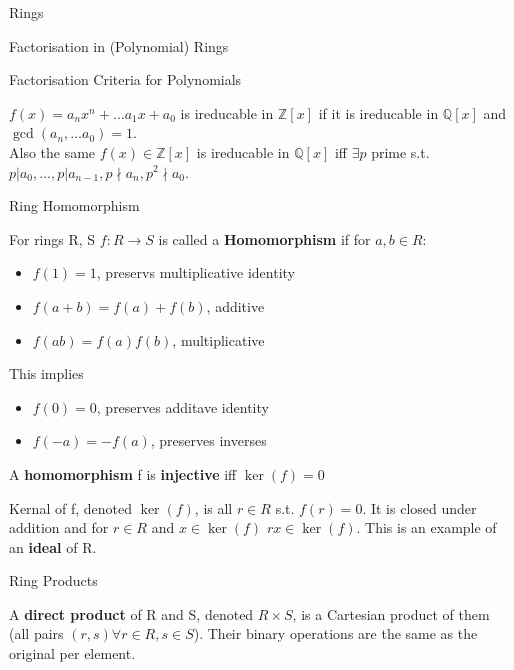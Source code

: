 \documentclass[12pt, letterpaper]{article}
\begin{document}
\begin{section}{Rings}
\begin{subsection}{Factorisation in (Polynomial) Rings}
    \begin{subsubsection}{Factorisation Criteria for Polynomials}

      \(f(x) = a_{n}x^{n} + \dots a_{1}x + a_{0}\) is ireducable in
      \(\mathbb{Z}[x]\) if it is ireducable in \(\mathbb{Q}[x]\) and
      \(\gcd(a_{n}, \dots a_{0}) = 1\). \\
      Also the same \(f(x) \in \mathbb{Z}[x]\) is ireducable in \(\mathbb{Q}[x]\)
      iff \(\exists p\) prime s.t.\ \(p | a_{0}, \dots , p | a_{n - 1}, p \nmid
      a_{n}, p^{2} \nmid a_{0}\).

    \end{subsubsection}

  \end{subsection}

  \begin{subsection}{Ring Homomorphism}

    For rings R, S \(f: R \to S\) is called a \textbf{Homomorphism} if for
    \(a, b \in R\):
    \begin{itemize}
      \item \(f(1) = 1\), preservs multiplicative identity
      \item \(f(a + b) = f(a) + f(b)\), additive
      \item \(f(ab) = f(a)f(b)\), multiplicative
    \end{itemize}

    This implies
    \begin{itemize}
      \item \(f(0) = 0\), preserves additave identity
      \item \(f(-a) = -f(a)\), preserves inverses
    \end{itemize}

    A \textbf{homomorphism} f is \textbf{injective} iff \(\ker(f) = 0\)

    Kernal of f, denoted \(\ker(f)\), is all \(r \in R\) s.t. \(f(r) = 0\). It is
    closed under addition and for \(r \in R\) and \(x \in \ker(f)\) \(rx \in \ker(f)\).
    This is an example of an \textbf{ideal} of R.

  \end{subsection}

  \begin{subsection}{Ring Products}

    A \textbf{direct product} of R and S, denoted \(R \times S\), is a Cartesian
    product of them (all pairs \((r, s) \forall r \in R, s \in S\)). Their
    binary operations are the same as the original per element.


\end{subsection}
\end{section}
\end{document}

